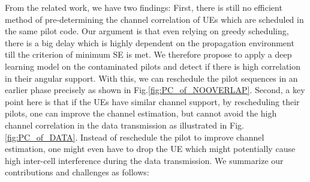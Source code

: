 From the related work, we have two findings: First, there is still no efficient method of pre-determining the channel correlation of UEs which are scheduled in the same pilot code. Our argument is that even relying on greedy scheduling, there is a big delay which is highly dependent on the propagation environment till the criterion of minimum SE is met. 
We therefore propose to apply a deep learning model on the contaminated pilots and detect if there is high correlation in their angular support. With this, we can reschedule the pilot sequences in an earlier phase precisely as shown in Fig.\ref{fig:PC_of_NOOVERLAP}. Second, a key point here is that if the UEs have similar channel support, by rescheduling their pilots, one can improve the channel estimation, but cannot avoid the high channel correlation in the data transmission as illustrated in Fig. \ref{fig:PC_of_DATA}. Instead of reschedule the pilot to improve channel estimation, one might even have to drop the UE which might potentially cause high inter-cell interference during the data transmission.  %
We summarize our contributions and challenges as follows:
